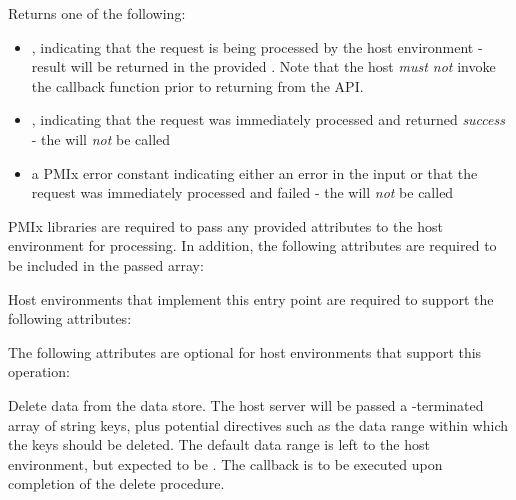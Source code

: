\begin{arglist}
\end{arglist}

Returns one of the following:

\begin{itemize}
    \item {}, indicating that the request is being processed by the host environment - result will be returned in the provided . Note that the host \emph{must not} invoke the callback function prior to returning from the \ac{API}.
    \item {}, indicating that the request was immediately processed and returned \textit{success} - the  will \textit{not} be called
    \item a PMIx error constant indicating either an error in the input or that the request was immediately processed and failed - the  will \textit{not} be called
\end{itemize}

\reqattrstart
\ac{PMIx} libraries are required to pass any provided attributes to the host environment for processing. In addition, the following attributes are required to be included in the passed  array:


\divider

Host environments that implement this entry point are required to support the following attributes:


\reqattrend

\optattrstart
The following attributes are optional for host environments that support this operation:


\optattrend

\descr

Delete data from the data store.
The host server will be passed a -terminated array of string keys, plus potential directives such as the data range within which the keys should be deleted. The default data range is left to the host environment, but expected to be .
The callback is to be executed upon completion of the delete procedure.


